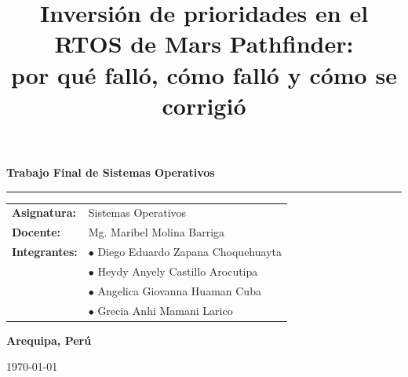\documentclass[journal]{IEEEtran}
\begin{document}
\begin{titlepage}
\begin{minipage}[c][0.92\textheight][s]{0.82\textwidth}
    {\large\bfseries\color{lasalleblue} Trabajo Final de Sistemas Operativos\par}
    \vspace{0.3cm}
    {\color{lasalleblue}\rule{\textwidth}{1.8pt}}
    \vfill
    \begin{flushleft}
      \hspace*{0.3cm}
      \begin{tabular}{ll}
        \textbf{\color{lasalledark} Asignatura:} & Sistemas Operativos \\[0.15cm]
        \textbf{\color{lasalledark} Docente:}    & Mg. Maribel Molina Barriga \\[0.15cm]
        \textbf{\color{lasalledark} Integrantes:} & $\bullet$ Diego Eduardo Zapana Choquehuayta \\
                                                  & $\bullet$ Heydy Anyely Castillo Arocutipa \\
                                                  & $\bullet$ Angelica Giovanna Huaman Cuba \\
                                                  & $\bullet$ Grecia Anhi Mamani Larico \\
      \end{tabular}
    \end{flushleft}
    \vfill
    {\large\bfseries\color{lasalledark} Arequipa, Perú\par}
    \vspace{0.15cm}
    {\small\color{gray} \today\par}
  \end{minipage}
\end{titlepage}

\clearpage
\twocolumn
\setcounter{page}{1}


\title{Inversión de prioridades en el RTOS de Mars Pathfinder:\\ por qué falló, cómo falló y cómo se corrigió}

\maketitle
\end{document}
